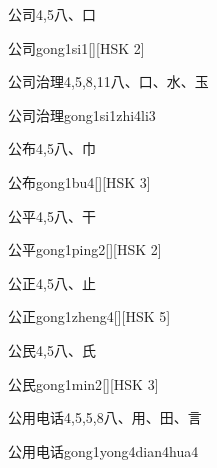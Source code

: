 \begin{entry}{公司}{4,5}{⼋、⼝}
  \begin{phonetics}{公司}{gong1si1}[][HSK 2]
  \end{phonetics}
\end{entry}

\begin{entry}{公司治理}{4,5,8,11}{⼋、⼝、⽔、⽟}
  \begin{phonetics}{公司治理}{gong1si1zhi4li3}
  \end{phonetics}
\end{entry}

\begin{entry}{公布}{4,5}{⼋、⼱}
  \begin{phonetics}{公布}{gong1bu4}[][HSK 3]
  \end{phonetics}
\end{entry}

\begin{entry}{公平}{4,5}{⼋、⼲}
  \begin{phonetics}{公平}{gong1ping2}[][HSK 2]
  \end{phonetics}
\end{entry}

\begin{entry}{公正}{4,5}{⼋、⽌}
  \begin{phonetics}{公正}{gong1zheng4}[][HSK 5]
  \end{phonetics}
\end{entry}

\begin{entry}{公民}{4,5}{⼋、⽒}
  \begin{phonetics}{公民}{gong1min2}[][HSK 3]
  \end{phonetics}
\end{entry}

\begin{entry}{公用电话}{4,5,5,8}{⼋、⽤、⽥、⾔}
  \begin{phonetics}{公用电话}{gong1yong4dian4hua4}
  \end{phonetics}
\end{entry}

